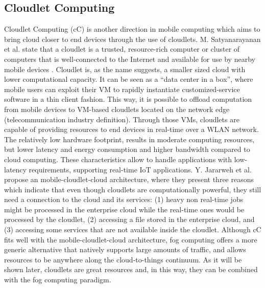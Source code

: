 \subsection{Cloudlet Computing}
Cloudlet Computing (cC) is another direction in mobile computing which aims to bring cloud closer to end devices through the use of cloudlets. M. Satyanarayanan et al. state that a cloudlet is a trusted, resource-rich computer or cluster of computers that is well-connected to the Internet and available for use by nearby mobile devices \cite{satyanarayanan2009case}. Cloudlet is, as the name suggests, a smaller sized cloud with lower computational capacity. It can be seen as a ``data center in a box'', where mobile users can exploit their VM to rapidly instantiate customized-service software in a thin client fashion. This way, it is possible to offload computation from mobile devices to VM-based cloudlets located on the network edge (telecommunication industry definition). Through those VMs, cloudlets are capable of providing resources to end devices in real-time over a WLAN network. The relatively low hardware footprint, results in moderate computing resources, but lower latency and energy consumption and higher bandwidth compared to cloud computing. These characteristics allow to handle applications with low-latency requirements, supporting real-time IoT applications. Y. Jararweh et al. \cite{jararweh2013resource} propose an mobile-cloudlet-cloud architecture, where they present three reasons which indicate that even though cloudlets are computationally powerful, they still need a connection to the cloud and its services: (1) heavy non real-time jobs might be processed in the enterprise cloud while the real-time ones would be processed by the cloudlet, (2) accessing a file stored in the enterprise cloud, and (3) accessing some services that are not available inside the cloudlet. Although cC fits well with the mobile-cloudlet-cloud architecture, fog computing offers a more generic alternative that natively supports large amounts of traffic, and allows resources to be anywhere along the cloud-to-things continuum. As it will be shown later, cloudlets are great resources and, in this way, they can be combined with the fog computing paradigm.

